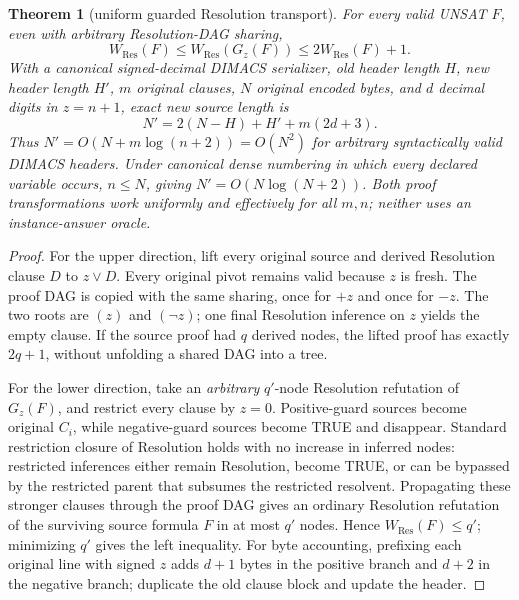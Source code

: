 \documentclass[11pt]{article}
\newtheorem{theorem}{Theorem}
\begin{document}
\begin{theorem}[uniform guarded Resolution transport]
For \emph{every} valid UNSAT $F$, even with arbitrary Resolution-DAG sharing,
\[
\boxed{W_{\mathrm{Res}}(F)\le W_{\mathrm{Res}}(G_z(F))
       \le 2W_{\mathrm{Res}}(F)+1.}
\]
With a canonical signed-decimal DIMACS serializer, old header length $H$, new header length $H'$, $m$ original clauses, $N$ original encoded bytes, and $d$ decimal digits in $z=n+1$, exact new source length is
\[
\boxed{N'=2(N-H)+H'+m(2d+3).}
\]
Thus $N'=O(N+m\log(n+2))=O(N^2)$ for arbitrary syntactically valid DIMACS headers. Under canonical dense numbering in which every declared variable occurs, $n\le N$, giving $N'=O(N\log(N+2))$. Both proof transformations work uniformly and effectively for all $m,n$; neither uses an instance-answer oracle.
\end{theorem}
\begin{proof}
For the upper direction, lift every original source and derived Resolution clause $D$ to $z\vee D$. Every original pivot remains valid because $z$ is fresh. The proof DAG is copied with the same sharing, once for $+z$ and once for $-z$. The two roots are $(z)$ and $(\neg z)$; one final Resolution inference on $z$ yields the empty clause. If the source proof had $q$ derived nodes, the lifted proof has exactly $2q+1$, without unfolding a shared DAG into a tree.

For the lower direction, take an \emph{arbitrary} $q'$-node Resolution refutation of $G_z(F)$, and restrict every clause by $z=0$. Positive-guard sources become original $C_i$, while negative-guard sources become TRUE and disappear. Standard restriction closure of Resolution holds with no increase in inferred nodes: restricted inferences either remain Resolution, become TRUE, or can be bypassed by the restricted parent that subsumes the restricted resolvent. Propagating these stronger clauses through the proof DAG gives an ordinary Resolution refutation of the surviving source formula $F$ in at most $q'$ nodes. Hence $W_{\mathrm{Res}}(F)\le q'$; minimizing $q'$ gives the left inequality. For byte accounting, prefixing each original line with signed $z$ adds $d+1$ bytes in the positive branch and $d+2$ in the negative branch; duplicate the old clause block and update the header.
\end{proof}
\end{document}
